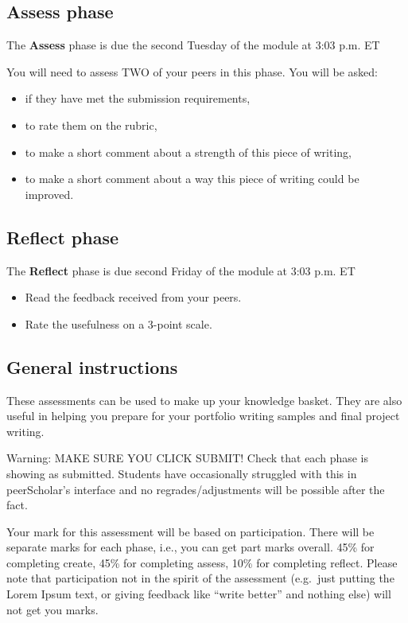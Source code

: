 \documentclass[
  openany]{book}
\begin{document}
\hypertarget{assess-phase}{%
\subsection{Assess phase}\label{assess-phase}}

The \textbf{Assess} phase is due the second Tuesday of the module at 3:03 p.m. ET

You will need to assess TWO of your peers in this phase. You will be asked:

\begin{itemize}
\item
  if they have met the submission requirements,
\item
  to rate them on the rubric,
\item
  to make a short comment about a strength of this piece of writing,
\item
  to make a short comment about a way this piece of writing could be improved.
\end{itemize}

\hypertarget{reflect-phase}{%
\subsection{Reflect phase}\label{reflect-phase}}

The \textbf{Reflect} phase is due second Friday of the module at 3:03 p.m. ET

\begin{itemize}
\item
  Read the feedback received from your peers.
\item
  Rate the usefulness on a 3-point scale.
\end{itemize}

\hypertarget{general-instructions-2}{%
\subsection{General instructions}\label{general-instructions-2}}

These assessments can be used to make up your knowledge basket. They are also useful in helping you prepare for your portfolio writing samples and final project writing.

Warning: MAKE SURE YOU CLICK SUBMIT! Check that each phase is showing as submitted. Students have occasionally struggled with this in peerScholar's interface and no regrades/adjustments will be possible after the fact.

Your mark for this assessment will be based on participation. There will be separate marks for each phase, i.e., you can get part marks overall. 45\% for completing create, 45\% for completing assess, 10\% for completing reflect. Please note that participation not in the spirit of the assessment (e.g.~just putting the Lorem Ipsum text, or giving feedback like ``write better'' and nothing else) will not get you marks.
\end{document}
